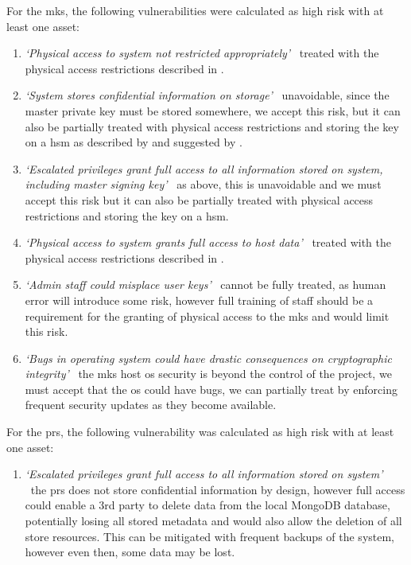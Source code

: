 For the \acrshort{mks}, the following vulnerabilities were calculated as high risk with at least one asset:
\begin{enumerate}
  \item
    \textit{`Physical access to system not restricted appropriately'} \textemdash\ treated with the physical access restrictions described in .
  \item
    \textit{`System stores confidential information on storage'} \textemdash\ unavoidable, since the master private key must be stored somewhere, we accept this risk, but it can also be partially treated with physical access restrictions and storing the key on a \acrfull{hsm} as described by \citet{DBLP:conf/esas/TrichinaK04} and suggested by \citet{Akinyele2011}.
  \item
    \textit{`Escalated privileges grant full access to all information stored on system, including master signing key'} \textemdash\ as above, this is unavoidable and we must accept this risk but it can also be partially treated with physical access restrictions and storing the key on a \acrshort{hsm}.
  \item
    \textit{`Physical access to system grants full access to host data'} \textemdash\ treated with the physical access restrictions described in .
  \item
    \textit{`Admin staff could misplace user keys'} \textemdash\ cannot be fully treated, as human error will introduce some risk, however full training of staff should be a requirement for the granting of physical access to the \acrshort{mks} and would limit this risk.
  \item
    \textit{`Bugs in operating system could have drastic consequences on cryptographic integrity'} \textemdash\ the \acrshort{mks} host \acrshort{os} security is beyond the control of the project, we must accept that the \acrshort{os} could have bugs, we can partially treat by enforcing frequent security updates as they become available.
\end{enumerate}

For the \acrshort{prs}, the following vulnerability was calculated as high risk with at least one asset:
\begin{enumerate}
  \item
    \textit{`Escalated privileges grant full access to all information stored on system'} \textemdash\ the \acrshort{prs} does not store confidential information by design, however full access could enable a 3rd party to delete data from the local MongoDB database, potentially losing all stored metadata and would also allow the deletion of all store resources. This can be mitigated with frequent backups of the system, however even then, some data may be lost.
\end{enumerate}

